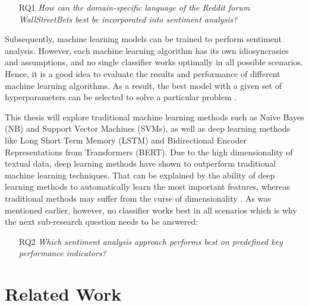 \documentclass[11pt, a4paper]{article}
\begin{document}
\begin{itemize}
    \item[RQ1] \emph{How can the domain-specific language of the Reddit forum WallStreetBets best be incorporated into sentiment analysis?}
\end{itemize}

Subsequently, machine learning models can be trained to perform sentiment analysis. However, 
each machine learning algorithm has its own idiosyncrasies and assumptions, and no single classifier 
works optimally in all possible scenarios. Hence, it is a good idea to evaluate the results and 
performance of different machine learning algorithms. As a result, the best model with a given set 
of hyperparameters can be selected to solve a particular problem \citep[p. 53]{raschka2019pythonmachinelearning}. 

This thesis will explore traditional machine learning methods such as Naive Bayes (NB) 
and Support Vector Machines (SVMs), as well as deep learning methods like 
Long Short Term Memory (LSTM) and Bidirectional Encoder Representations from 
Transformers (BERT). Due to the high dimensionality of textual data, deep learning methods have shown 
to outperform traditional machine learning techniques. That can be explained by the 
ability of deep learning methods to automatically learn the most important features, whereas traditional 
methods may suffer from the curse of dimensionality \citep{fu2018lexiconenhancedlstm}.
As was mentioned earlier, however, no classifier works best in all scenarios which is why the next sub-research question needs to be answered:

\begin{itemize}
    \item[RQ2] \emph{Which sentiment analysis approach performs best on predefined key performance indicators?}
\end{itemize}

\section{Related Work}
\end{document}
